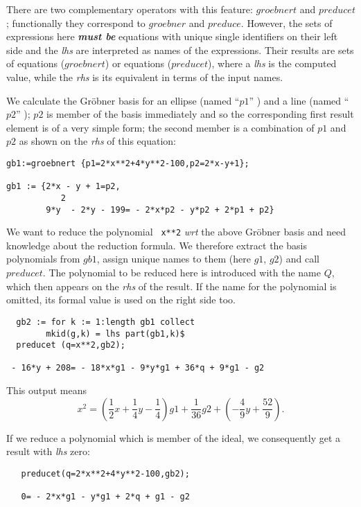  
There are two complementary operators with this feature: $groebnert$
and $preducet$; functionally they correspond to $groebner$ and $preduce$.
However, the sets of expressions here {\it {\bf must be}} equations
with unique single identifiers on their left side and the {\it lhs} are
interpreted as names of the expressions. Their results are
sets of equations ($groebnert$) or equations ($preducet$), where
a {\it lhs} is the computed value, while the {\it rhs} is its equivalent
in terms of the input names.

\example {}

We calculate the Gr\"obner basis for an ellipse (named ``$p1$'' ) and a
line (named ``$p2$'' ); $p2$ is member of the basis immediately and so
the corresponding first result element is of a very simple form; the
second member is a combination of $p1$ and $p2$ as shown on the
{\it rhs} of this equation:

\begin{verbatim}
gb1:=groebnert {p1=2*x**2+4*y**2-100,p2=2*x-y+1};

gb1 := {2*x - y + 1=p2,
           2
        9*y  - 2*y - 199= - 2*x*p2 - y*p2 + 2*p1 + p2}
\end{verbatim}

\example {}

We want to reduce the polynomial \verb+ x**2+ {\it  wrt}
the above Gr\"obner basis and need knowledge about the reduction
formula. We therefore extract the basis polynomials from $gb1$,
assign unique names to them (here $g1$, $g2$) and call $preducet$.
The polynomial to be reduced here is introduced with the name $Q$,
which then appears on the {\it rhs} of the result. If the name for the
polynomial is omitted, its formal value is used on the right side too.

\begin{verbatim}
  gb2 := for k := 1:length gb1 collect
        mkid(g,k) = lhs part(gb1,k)$
  preducet (q=x**2,gb2);

 - 16*y + 208= - 18*x*g1 - 9*y*g1 + 36*q + 9*g1 - g2
\end{verbatim}

This output means
\[
x^2 = (\frac{1}{2} x + \frac{1}{4} y - \frac{1}{4}) g1
 + \frac{1}{36} g2 + (-\frac{4}{9} y + \frac{52}{9}).
\]


\example {}

If we reduce a polynomial which is member of the ideal, we
consequently get a result with {\it lhs} zero:
\begin{verbatim}
   preducet(q=2*x**2+4*y**2-100,gb2);

   0= - 2*x*g1 - y*g1 + 2*q + g1 - g2
\end{verbatim}

